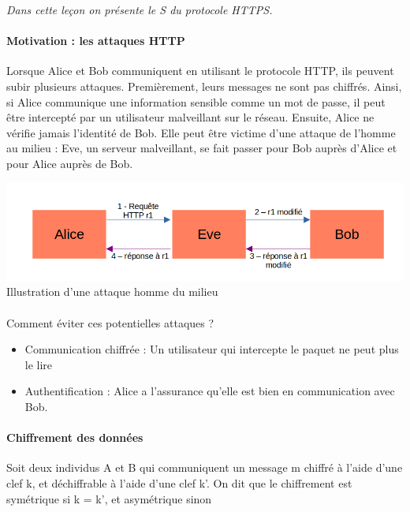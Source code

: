 
\textit{Dans cette leçon on présente le S du protocole HTTPS.}

\paragraph{Motivation : les attaques HTTP \\}
	Lorsque Alice et Bob communiquent en utilisant le protocole HTTP, ils peuvent subir plusieurs attaques. Premièrement, leurs messages ne sont pas chiffrés. Ainsi, si Alice communique une information sensible comme un mot de passe, il peut être intercepté par un utilisateur malveillant sur le réseau. Ensuite, Alice ne vérifie jamais l'identité de Bob. Elle peut être victime d'une attaque de l'homme au milieu : Eve, un serveur malveillant, se fait passer pour Bob auprès d'Alice et pour Alice auprès de Bob.

\begin{center}
	\includegraphics[scale=0.5]{Developpements/Protocole HTTPS/homme_du_milieu.png}
	{Illustration d'une attaque homme du milieu}
\end{center}

\paragraph{}
	Comment éviter ces potentielles attaques ? 
	\begin{itemize}
		\item Communication chiffrée : Un utilisateur qui intercepte le paquet ne peut plus le lire
		\item Authentification : Alice a l'assurance qu'elle est bien en communication avec Bob.
	\end{itemize}

\paragraph{Chiffrement des données}
\begin{definition}
	Soit deux individus A et B qui communiquent un message m chiffré à l'aide d'une clef k, et déchiffrable à l'aide d'une clef k'. On dit que le chiffrement est symétrique si k = k', et asymétrique sinon
\end{definition}


